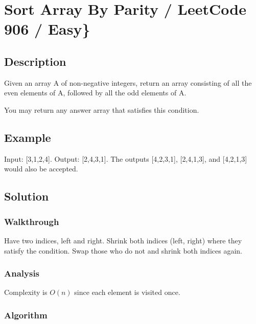 \documentclass[]{book}
\begin{document}
\hypertarget{sort-array-by-parity-leetcode-906-easy}{%
\section{Sort Array By Parity / LeetCode 906 / Easy\}}\label{sort-array-by-parity-leetcode-906-easy}}

\hypertarget{description-17}{%
\subsection{Description}\label{description-17}}

Given an array A of non-negative integers, return an array consisting of all the even elements of A, followed by all
the odd elements of A.

You may return any answer array that satisfies this condition.

\hypertarget{example-16}{%
\subsection{Example}\label{example-16}}

Input: {[}3,1,2,4{]}. Output: {[}2,4,3,1{]}. The outputs {[}4,2,3,1{]}, {[}2,4,1,3{]}, and {[}4,2,1,3{]} would also be accepted.

\hypertarget{solution-12}{%
\subsection{Solution}\label{solution-12}}

\hypertarget{walkthrough-16}{%
\subsubsection{Walkthrough}\label{walkthrough-16}}

Have two indices, left and right. Shrink both indices (left, right) where they satisfy the condition. Swap those
who do not and shrink both indices again.

\hypertarget{analysis-18}{%
\subsubsection{Analysis}\label{analysis-18}}

Complexity is \(O(n)\) since each element is visited once.

\hypertarget{algorithm-18}{%
\subsubsection{Algorithm}\label{algorithm-18}}
\end{document}
